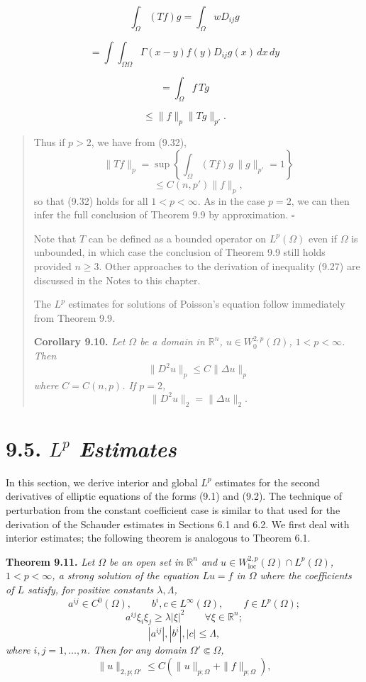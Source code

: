 \[
\int_{\Omega} (Tf)g = \int_{\Omega} wD_{ij}g
\]

\[
= \int\!\!\int_{\Omega\Omega} \Gamma(x-y)f(y)D_{ij}g(x)\,dx\,dy
\]

\[
= \int_{\Omega} f\,Tg
\]

\[
\le \|f\|_p\|Tg\|_{p'}.
\]



\begin{quote}
Thus if $p>2$, we have from (9.32),
\[
\|Tf\|_p=\sup\left\{\int_\Omega (Tf)g \,\|g\|_{p'}=1\right\}
\]
\[
\le C(n,p')\|f\|_p,
\]
so that (9.32) holds for all $1<p<\infty$. As in the case $p=2$, we can then infer the full conclusion of Theorem 9.9 by approximation. $\square$

Note that $T$ can be defined as a bounded operator on $L^p(\Omega)$ even if $\Omega$ is unbounded, in which case the conclusion of Theorem 9.9 still holds provided $n\ge 3$. Other approaches to the derivation of inequality (9.27) are discussed in the Notes to this chapter.

The $L^p$ estimates for solutions of Poisson's equation follow immediately from Theorem 9.9.

\textbf{Corollary 9.10.}
\emph{Let $\Omega$ be a domain in $\mathbb{R}^n$, $u\in W^{2,p}_0(\Omega)$, $1<p<\infty$. Then}
\begin{equation}\tag{9.33}
\|D^2u\|_p\le C\|\Delta u\|_p
\end{equation}
\emph{where $C=C(n,p)$. If $p=2$,}
\begin{equation}\tag{9.34}
\|D^2u\|_2=\|\Delta u\|_2.
\end{equation}
\end{quote}

\section*{9.5. \emph{$L^p$ Estimates}}

In this section, we derive interior and global $L^p$ estimates for the second derivatives of elliptic equations of the forms (9.1) and (9.2). The technique of perturbation from the constant coefficient case is similar to that used for the derivation of the Schauder estimates in Sections 6.1 and 6.2. We first deal with interior estimates; the following theorem is analogous to Theorem 6.1.

\textbf{Theorem 9.11.}
\emph{Let $\Omega$ be an open set in $\mathbb{R}^n$ and $u\in W^{2,p}_{\mathrm{loc}}(\Omega)\cap L^p(\Omega)$, $1<p<\infty$, a strong solution of the equation $Lu=f$ in $\Omega$ where the coefficients of $L$ satisfy, for positive constants $\lambda,\Lambda$,}
\[
a^{ij}\in C^0(\Omega), \qquad b^i,c\in L^\infty(\Omega), \qquad f\in L^p(\Omega);
\]
\begin{equation}\tag{9.35}
a^{ij}\xi_i\xi_j\ge \lambda |\xi|^2 \qquad \forall \xi\in \mathbb{R}^n;
\end{equation}
\[
|a^{ij}|, |b^i|, |c| \le \Lambda,
\]
\emph{where $i,j=1,\ldots,n$. Then for any domain $\Omega' \Subset \Omega$,}
\begin{equation}\tag{9.36}
\|u\|_{2,p;\Omega'}\le C(\|u\|_{p;\Omega}+\|f\|_{p;\Omega}),
\end{equation}


